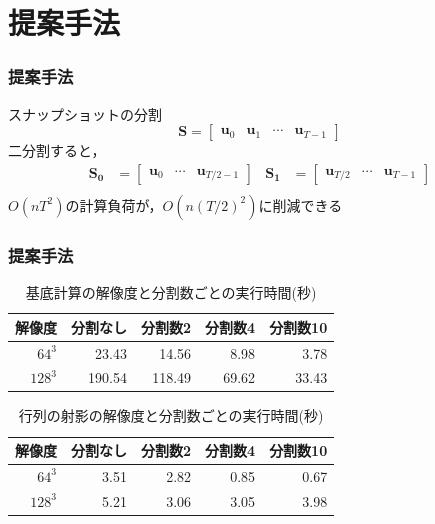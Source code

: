 \documentclass[aspectratio=169,dvipdfmx,hyperref={bookmarks=true}]{beamer}
\begin{document}
\section{提案手法}
\begin{frame}
\frametitle{提案手法}
\begin{block}{スナップショットの分割}
 \[ \bm{S} = 
        		\begin{bmatrix}
   \bm{u}_0 & \bm{u}_1 &\cdots  & \bm{u}_{T-1}
\end{bmatrix}
\]
二分割すると，
\begin{align*}
	\bm{S_0} 		&= \begin{bmatrix}\bm{u}_0 &\cdots  & \bm{u}_{T/2-1}\end{bmatrix}		&\bm{S_1} 	&= \begin{bmatrix} \bm{u}_{T/2}  &\cdots  & \bm{u}_{T-1}\end{bmatrix}\\
\end{align*}
$O(nT^2)$の計算負荷が，$O(n(T/2)^2)$に削減できる
\end{block}
 \end{frame}

 \begin{frame}
 \frametitle{提案手法}
 \begin {table}[htbp]
    \centering
  \caption{基底計算の解像度と分割数ごとの実行時間(秒)}
  \label{tab:basis}
  \begin {tabular}{rrrrr} \hline
    \multicolumn{1}{c}{解像度} 					&\multicolumn{1}{c}{分割なし} 		&\multicolumn{1}{c}{分割数2}			&\multicolumn{1}{c}{分割数4} 		&\multicolumn{1}{c}{分割数10}\\ \hline
    $64^3$ 					& 23.43 			&14.56	 		&8.98	 	&3.78\\
    $128^3$ 				& 190.54 			&118.49 			& 69.62 		&33.43\\ \hline
  \end {tabular}
\end {table}

\begin {table}[htbp]
    \centering
  \caption{行列の射影の解像度と分割数ごとの実行時間(秒)}
  \label{tab:projection}
  \begin {tabular}{rrrrr} \hline
    \multicolumn{1}{c}{解像度} 					&\multicolumn{1}{c}{分割なし} 		&\multicolumn{1}{c}{分割数2}			&\multicolumn{1}{c}{分割数4} 		&\multicolumn{1}{c}{分割数10}\\ \hline
    $64^3$ 					& 3.51 			&2.82	 		&0.85	 		&0.67\\
    $128^3$ 				& 5.21 			& 3.06 			& 3.05 			&3.98\\ \hline
  \end {tabular}
\end {table}

\end{frame}
\end{document}
